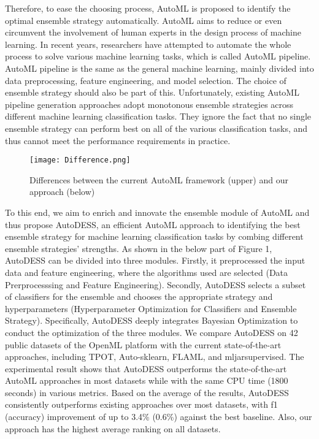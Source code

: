 \documentclass[review]{elsarticle}
\begin{document}
Therefore, to ease the choosing process, AutoML is proposed to identify the optimal ensemble strategy automatically. AutoML aims to reduce or even circumvent the involvement of human experts in the design process of machine learning\cite{he2021automl}\cite{zoller2021benchmark}. In recent years, researchers have attempted to automate the whole process to solve various machine learning tasks, which is called AutoML pipeline. AutoML pipeline is the same as the general machine learning, mainly divided into data preprocessing, feature engineering, and model selection. The choice of ensemble strategy should also be part of this. Unfortunately, existing AutoML pipeline generation approaches adopt monotonous ensemble strategies across different machine learning classification tasks. They ignore the fact that no single ensemble strategy can perform best on all of the various classification tasks, and thus cannot meet the performance requirements in practice.
\begin{figure}[htbp]
	\centering
	\texttt{[image: Difference.png]}
	\caption{Differences between the current AutoML framework (upper) and our approach (below)}
\end{figure}

To this end, we aim to enrich and innovate the ensemble module of AutoML and thus propose AutoDESS, an efficient AutoML approach to identifying the best ensemble strategy for machine learning classification tasks by combing different ensemble strategies' strengths. As shown in the below part of Figure 1, AutoDESS can be divided into three modules. Firstly, it preprocessed the input data and feature engineering, where the algorithms used are selected (Data Prerprocesssing and Feature Engineering). Secondly, AutoDESS selects a subset of classifiers for the ensemble and chooses the appropriate strategy and hyperparameters (Hyperparameter Optimization for Classifiers and Ensemble Strategy). Specifically, AutoDESS deeply integrates Bayesian Optimization to conduct the optimization of the three modules. We compare AutoDESS on 42 public datasets of the OpenML platform with the current state-of-the-art approaches, including TPOT, Auto-sklearn, FLAML, and mljarsupervised\cite{DBLP:books/sp/19/OlsonM19}\cite{DBLP:conf/mlsys/0001WWZ21}\cite{feurer2015efficient}\cite{mljar}. The experimental result shows that AutoDESS outperforms the state-of-the-art AutoML approaches in most datasets while with the same CPU time (1800 seconds) in various metrics. Based on the average of the results, AutoDESS consistently outperforms existing approaches over most datasets, with f1 (accuracy) improvement of up to 3.4\% (0.6\%) against the best baseline. Also, our approach has the highest average ranking on all datasets.
\end{document}
